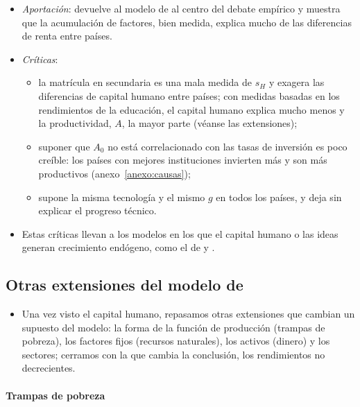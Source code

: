 \documentclass[11pt]{article}
\begin{document}
\begin{itemize}
\item \emph{Aportación}: devuelve al modelo de  al centro del debate empírico y muestra que la acumulación de factores, bien medida, explica mucho de las diferencias de renta entre países.
\item \emph{Críticas}:
  \begin{itemize}
  \item la matrícula en secundaria es una mala medida de $s_H$ y exagera las diferencias de capital humano entre países; con medidas basadas en los rendimientos de la educación, el capital humano explica mucho menos y la productividad, $A$, la mayor parte (véanse las extensiones);
  \item suponer que $A_0$ no está correlacionado con las tasas de inversión es poco creíble: los países con mejores instituciones invierten más y son más productivos (anexo~\ref{anexo:causas});
  \item supone la misma tecnología y el mismo $g$ en todos los países, y deja sin explicar el progreso técnico.
  \end{itemize}
\item Estas críticas llevan a los modelos en los que el capital humano o las ideas generan crecimiento endógeno, como el de  y  .
\end{itemize}

\subsection{Otras extensiones del modelo de }\label{sec:extensiones-solow}

\begin{itemize}
\item Una vez visto el capital humano, repasamos otras extensiones que cambian un supuesto del modelo: la forma de la función de producción (trampas de pobreza), los factores fijos (recursos naturales), los activos (dinero) y los sectores; cerramos con la que cambia la conclusión, los rendimientos no decrecientes.
\end{itemize}

\paragraph{Trampas de pobreza}
\end{document}
